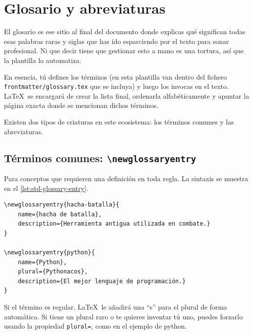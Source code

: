 
\section{Glosario y abreviaturas}
\label{s:glosario}

El glosario es ese sitio al final del documento donde explicas qué significan todas esas palabras raras y siglas que has ido esparciendo por el texto para sonar profesional. Ni que decir tiene que gestionar esto a mano es una tortura, así que la plantilla lo automatiza.

En esencia, tú defines los términos (en esta plantilla van dentro del fichero \texttt{frontmatter/glossary.tex} que se incluya) y luego los invocas en el texto. \LaTeX\ se encargará de crear la lista final, ordenarla alfabéticamente y apuntar la página exacta donde se mencionan dichos términos.

Existen dos tipos de criaturas en este ecosistema: los términos comunes y las abreviaturas.

\subsection{Términos comunes: \texttt{\textbackslash newglossaryentry}}

Para conceptos que requieren una definición en toda regla. La sintaxis se muestra en el \autoref{lst:std-glossary-entry}.

\begin{lstlisting}[language={[latex]TeX},caption=Creación de términos de glosario,label=lst:std-glossary-entry]
\newglossaryentry{hacha-batalla}{
    name={hacha de batalla},
    description={Herramienta antigua utilizada en combate.}
}

\newglossaryentry{python}{
    name={Python},
    plural={Pythonacos},
    description={El mejor lenguaje de programación.}
}
\end{lstlisting}

Si el término es regular, \LaTeX\ le añadirá una \enquote{s} para el plural de forma automática. Si tiene un plural raro o te quieres inventar tú uno, puedes forzarlo usando la propiedad \texttt{plural=}, como en el ejemplo de \gls{python}.

